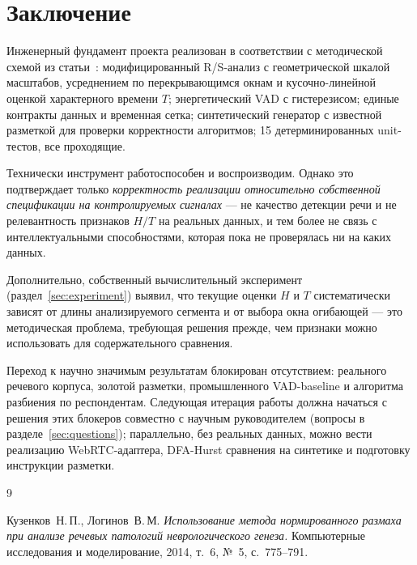 \documentclass[12pt,a4paper]{article}
\begin{document}
\section{Заключение}

Инженерный фундамент проекта реализован в соответствии с методической
схемой из статьи~\cite{kuzenkov2014}: модифицированный R/S-анализ с
геометрической шкалой масштабов, усреднением по перекрывающимся окнам и
кусочно-линейной оценкой характерного времени $T$; энергетический VAD с
гистерезисом; единые контракты данных и временная сетка; синтетический
генератор с известной разметкой для проверки корректности алгоритмов;
15 детерминированных unit-тестов, все проходящие.

Технически инструмент работоспособен и воспроизводим. Однако это
подтверждает только \emph{корректность реализации относительно собственной
спецификации на контролируемых сигналах} — не качество детекции речи и не
релевантность признаков $H/T$ на реальных данных, и тем более не связь с
интеллектуальными способностями, которая пока не проверялась ни на каких
данных.

Дополнительно, собственный вычислительный эксперимент
(раздел~\ref{sec:experiment}) выявил, что текущие оценки $H$ и $T$
систематически зависят от длины анализируемого сегмента и от выбора окна
огибающей — это методическая проблема, требующая решения прежде, чем
признаки можно использовать для содержательного сравнения.

Переход к научно значимым результатам блокирован отсутствием: реального
речевого корпуса, золотой разметки, промышленного VAD-baseline и алгоритма
разбиения по респондентам. Следующая итерация работы должна начаться с
решения этих блокеров совместно с научным руководителем (вопросы в
разделе~\ref{sec:questions}); параллельно, без реальных данных, можно вести
реализацию WebRTC-адаптера, DFA-Hurst сравнения на синтетике и подготовку
инструкции разметки.

\begin{thebibliography}{9}

Кузенков~Н.\,П., Логинов~В.\,М.
\textit{Использование метода нормированного размаха при анализе речевых
патологий неврологического генеза.}
Компьютерные исследования и моделирование, 2014, т.~6, №~5, с.~775--791.

\end{thebibliography}
\end{document}
